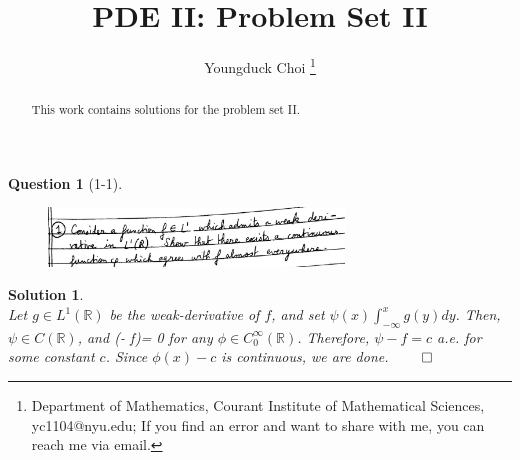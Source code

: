 \documentclass[11pt]{article}
\date{}
\title{\vspace{-0.7cm}
PDE II: Problem Set II}
\author{
Youngduck Choi 
\thanks{Department of Mathematics, Courant Institute of Mathematical Sciences, 
yc1104@nyu.edu; If you find an error and want to share with me, 
you can reach me via email.
}}
\theoremstyle{plain}
\def\eQb#1\eQe{\begin{eqnarray*}#1\end{eqnarray*}}
\theoremstyle{quest}
\newtheorem*{question}{Question}
\newtheorem*{solution}{Solution}
\begin{document}
\maketitle

\begin{abstract}
This work contains solutions for the problem set II.
\end{abstract}


\begin{question}[1-1]
\hfill
\begin{figure}[h!]
  \centering
    \includegraphics[width=0.7\textwidth]{pde2-s2-p1.png}
\end{figure}
\end{question}
\begin{solution} \hfill \\
Let $g \in L^1(\mathbb{R})$ be the weak-derivative of $f$, and set
$\psi(x) \int_{-\infty}^{x} g(y) dy$. Then, $\psi \in C(\mathbb{R})$, and 
\eQb
\int(\psi - f)\phi = 0
\eQe
for any $\phi \in C_0^{\infty}(\mathbb{R})$. Therefore, $\psi - f = c$ a.e.
for some constant $c$. Since $\phi(x) - c$ is continuous, we are done. \hfill 
$\qed$
\end{solution}

\newpage
\end{document}
